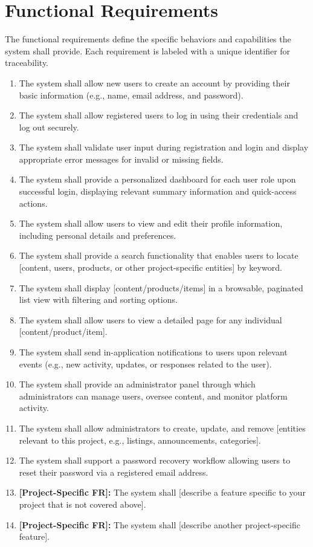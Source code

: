 \documentclass[12pt, a4paper]{article}
\begin{document}
\section{Functional Requirements}

The functional requirements define the specific behaviors and capabilities the system shall provide. Each requirement is labeled with a unique identifier for traceability.

\begin{enumerate}[label=\textbf{FR-\arabic*:}, leftmargin=*, align=left]
    \item The system shall allow new users to create an account by providing their basic information (e.g., name, email address, and password).
    \item The system shall allow registered users to log in using their credentials and log out securely.
    \item The system shall validate user input during registration and login and display appropriate error messages for invalid or missing fields.
    \item The system shall provide a personalized dashboard for each user role upon successful login, displaying relevant summary information and quick-access actions.
    \item The system shall allow users to view and edit their profile information, including personal details and preferences.
    \item The system shall provide a search functionality that enables users to locate [content, users, products, or other project-specific entities] by keyword.
    \item The system shall display [content/products/items] in a browsable, paginated list view with filtering and sorting options.
    \item The system shall allow users to view a detailed page for any individual [content/product/item].
    \item The system shall send in-application notifications to users upon relevant events (e.g., new activity, updates, or responses related to the user).
    \item The system shall provide an administrator panel through which administrators can manage users, oversee content, and monitor platform activity.
    \item The system shall allow administrators to create, update, and remove [entities relevant to this project, e.g., listings, announcements, categories].
    \item The system shall support a password recovery workflow allowing users to reset their password via a registered email address.
    \item \textbf{[Project-Specific FR]:} The system shall [describe a feature specific to your project that is not covered above].
    \item \textbf{[Project-Specific FR]:} The system shall [describe another project-specific feature].
\end{enumerate}
\end{document}
